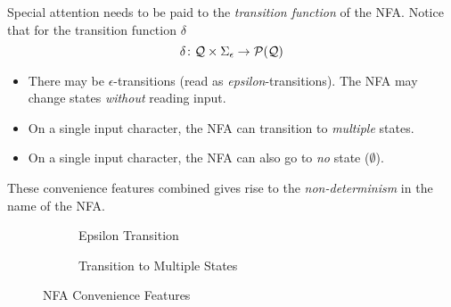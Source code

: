 \begin{remark}
    Special attention needs to be paid to the \textit{transition function} of the NFA. Notice that for the transition function $\delta$
    \begin{equation}
        \delta \colon \mathcal{Q} \times \Sigma_{\epsilon} \to \mathcal{P}(\mathcal{Q})
    \end{equation}

    \begin{itemize}
        \item There may be $\epsilon$-transitions (read as \textit{epsilon}-transitions). The NFA may change states \textit{without} reading input.
        \item On a single input character, the NFA can transition to \textit{multiple} states.
        \item On a single input character, the NFA can also go to \textit{no} state ($\emptyset$).
    \end{itemize}
    
    These convenience features combined gives rise to the \textit{non-determinism} in the name of the NFA.
    
    \begin{figure}[H]
        \centering
        \begin{subfigure}{0.45\textwidth}
            \centering
            \caption{Epsilon Transition}
        \end{subfigure}
        \begin{subfigure}{0.45\textwidth}
            \centering
            \caption{Transition to Multiple States}
        \end{subfigure}
        \caption{NFA Convenience Features}
        \label{fig:nfa-notation}
    \end{figure}
\end{remark}

